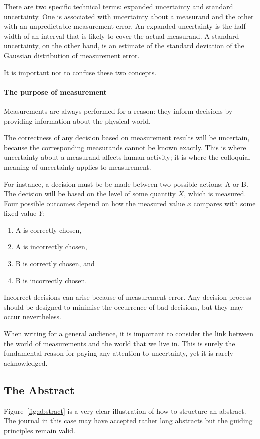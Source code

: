 There are two specific technical terms: expanded uncertainty and standard uncertainty. One is associated with uncertainty about a measurand and the other with an unpredictable measurement error. An expanded uncertainty is the half-width of an interval that is likely to cover the actual measurand. A standard uncertainty, on the other hand, is an estimate of the standard deviation of the Gaussian distribution of measurement error.

It is important not to confuse these two concepts.

\paragraph{The purpose of measurement}
Measurements are always performed for a reason: they inform decisions by providing information about the physical world. 

The correctness of any decision based on measurement results will be uncertain, because the corresponding measurands cannot be known exactly. This is where uncertainty about a measurand affects human activity; it is where the colloquial meaning of uncertainty applies to measurement. 

For instance, a decision must be be made between two possible actions: A or B. The decision will be based on the level of some quantity $X$, which is measured. Four possible outcomes depend on how the measured value $x$ compares with some fixed value $Y$: 
\begin{enumerate}[label=\roman*)]
\item A is correctly chosen, 
\item A is incorrectly chosen, 
\item B is correctly chosen, and 
\item B is incorrectly chosen.
\end{enumerate} 
Incorrect decisions can arise because of measurement error. Any decision process should be designed to minimise the occurrence of bad decisions, but they may occur nevertheless. 

When writing for a general audience, it is important to consider the link between the world of measurements and the world that we live in. This is surely the fundamental reason for paying any attention to uncertainty, yet it is rarely acknowledged. 

\subsection{The Abstract}
Figure~\ref{fig:abstract} is a very clear illustration of how to structure an abstract. The journal in this case may have accepted rather long abstracts but the guiding principles remain valid.

